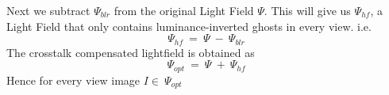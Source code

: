 Next we subtract $\Psi_{blr}$ from the original Light Field $\Psi$. This will give us  $\Psi_{hf}$, a Light Field that only contains luminance-inverted ghosts in every view. i.e.
\begin{equation}
\Psi_{hf}\: =\: \Psi\: -\: \Psi_{blr}
\end{equation}
The crosstalk compensated lightfield is obtained as
\begin{equation}
\Psi_{opt}\: =\: \Psi\: +\: \Psi_{hf}
\end{equation}
Hence for every view image $I \in\: \Psi_{opt}$

















